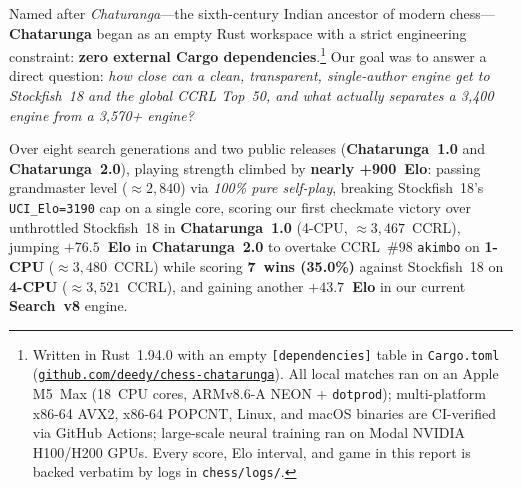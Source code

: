 \documentclass[10.5pt,letterpaper]{article}
\begin{document}
Named after \emph{Chaturanga}---the sixth-century Indian ancestor of modern chess---\textbf{Chatarunga} began as an empty Rust workspace with a strict engineering constraint: \textbf{zero external Cargo dependencies}.\footnote{Written in Rust~1.94.0 with an empty \texttt{[dependencies]} table in \texttt{Cargo.toml} (\href{https://github.com/deedy/chess-chatarunga}{\texttt{github.com/deedy/chess-chatarunga}}). All local matches ran on an Apple M5~Max (18~CPU cores, ARMv8.6-A NEON + \texttt{dotprod}); multi-platform x86-64 AVX2, x86-64 POPCNT, Linux, and macOS binaries are CI-verified via GitHub Actions; large-scale neural training ran on Modal NVIDIA H100/H200 GPUs. Every score, Elo interval, and game in this report is backed verbatim by logs in \texttt{chess/logs/}.} Our goal was to answer a direct question: \emph{how close can a clean, transparent, single-author engine get to Stockfish~18 and the global CCRL Top~50, and what actually separates a 3,400 engine from a 3,570+ engine?}

Over eight search generations and two public releases (\textbf{Chatarunga~1.0} and \textbf{Chatarunga~2.0}), playing strength climbed by \textbf{nearly +900~Elo}: passing grandmaster level ($\approx 2{,}840$) via \emph{100\% pure self-play}, breaking Stockfish~18's \texttt{UCI\_Elo=3190} cap on a single core, scoring our first checkmate victory over unthrottled Stockfish~18 in \textbf{Chatarunga~1.0} (4-CPU, $\approx 3{,}467$~CCRL), jumping \textbf{$+76.5$~Elo} in \textbf{Chatarunga~2.0} to overtake CCRL~\#98 \texttt{akimbo} on \textbf{1-CPU} ($\approx 3{,}480$~CCRL) while scoring \textbf{7~wins (35.0\%)} against Stockfish~18 on \textbf{4-CPU} ($\approx 3{,}521$~CCRL), and gaining another \textbf{$+43.7$~Elo} in our current \textbf{Search~v8} engine.
\end{document}
